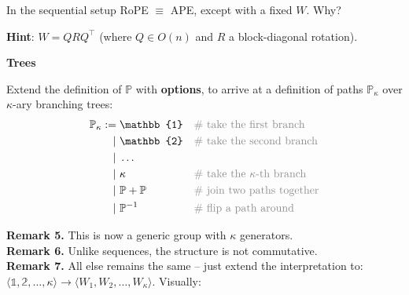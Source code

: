 \documentclass{article}
\newcommand{\sectionfont}{\fontsize{34}{34}\selectfont\setlength{\parskip}{1\baselineskip}}
\newcommand{\nfont}{\fontsize{21}{22}\selectfont\setlength{\parskip}{1\baselineskip}}
\newcommand{\light}[1]{\textcolor{gray!90}{#1}}
\newcommand{\Path}{\ensuremath{\mathbb{P}}}
\newcommand{\one}{\ensuremath{\mathbb{1}}}
\newcommand{\two}{\ensuremath{\mathbb{2}}}
\begin{document}
\begin{minipage}[t]{0.28\textwidth}
		In the sequential setup RoPE $\equiv$ APE, except with a fixed $W$. Why? \\
		\vspace{-2\baselineskip}
		\begin{flushright}
		\light{
			\textbf{Hint}: $W = QRQ^\top$ (where $Q \in O(n)$ and $R$ a block-diagonal rotation).
		}
		\end{flushright}		 
		
		\sectionfont
		\vspace{\parskip}
		\textbf{Trees}
		
		\nfont
		Extend the definition of $\Path$ with \textbf{options}, to arrive at a definition of paths $\Path_{\kappa}$ over $\kappa$-ary branching trees:
		\begin{align*}
			\Path_{\kappa} & := 
			 \one & & \light{\text{\# take the first branch}}\\
			  & \quad | ~ \two & & \light{\text{\# take the second branch}}\\
			  & \quad | ~ \dots\\
 			  & \quad | ~ \kappa & & \light{\text{\# take the $\kappa$-th branch}}\\
		      & \quad | ~ \Path + \Path & & \light{\text{\# join two paths together}}\\
		      & \quad | ~ \Path^{-1} & & \light{\text{\# flip a path around}}
		\end{align*}
		
		\textbf{Remark 5.} This is now a generic group with $\kappa$ generators.\\
		\textbf{Remark 6.} Unlike sequences, the structure is not commutative.\\
		\textbf{Remark 7.} All else remains the same -- just extend the interpretation to:\\
		$ \langle \one,\two,\dots,\kappa \rangle \to \langle W_1, W_2,\dots,W_\kappa \rangle$. Visually:


\end{minipage}
\end{document}

